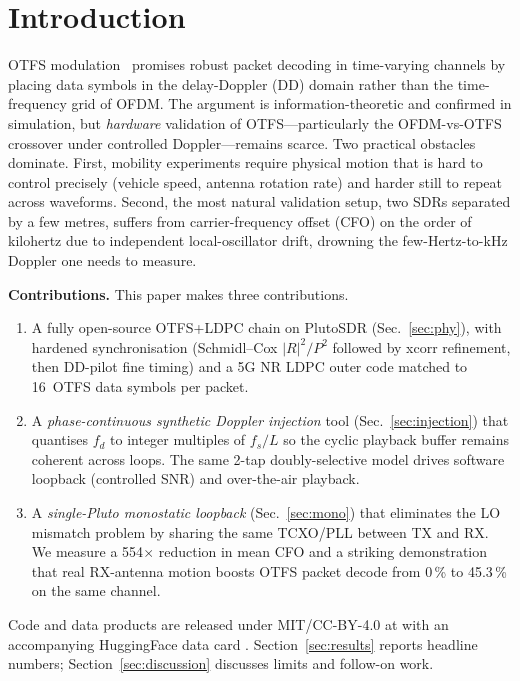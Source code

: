 \documentclass[conference,10pt]{IEEEtran}
\newcommand{\fd}{f_d}
\begin{document}
\section{Introduction}
OTFS modulation~\cite{Hadani2017OTFS} promises robust packet decoding in time-varying channels by placing data symbols in the delay-Doppler (DD) domain rather than the time-frequency grid of OFDM. The argument is information-theoretic and confirmed in simulation, but \emph{hardware} validation of OTFS---particularly the OFDM-vs-OTFS crossover under controlled Doppler---remains scarce. Two practical obstacles dominate. First, mobility experiments require physical motion that is hard to control precisely (vehicle speed, antenna rotation rate) and harder still to repeat across waveforms. Second, the most natural validation setup, two SDRs separated by a few metres, suffers from carrier-frequency offset (CFO) on the order of kilohertz due to independent local-oscillator drift, drowning the few-Hertz-to-kHz Doppler one needs to measure.

\textbf{Contributions.} This paper makes three contributions.
\begin{enumerate}[leftmargin=*,nosep]
  \item A fully open-source OTFS+LDPC chain on PlutoSDR (Sec.~\ref{sec:phy}), with hardened synchronisation (Schmidl--Cox $|R|^2/P^2$ followed by xcorr refinement, then DD-pilot fine timing) and a 5G NR LDPC outer code matched to 16~OTFS data symbols per packet.
  \item A \emph{phase-continuous synthetic Doppler injection} tool (Sec.~\ref{sec:injection}) that quantises $\fd$ to integer multiples of $f_s/L$ so the cyclic playback buffer remains coherent across loops. The same 2-tap doubly-selective model drives software loopback (controlled SNR) and over-the-air playback.
  \item A \emph{single-Pluto monostatic loopback} (Sec.~\ref{sec:mono}) that eliminates the LO mismatch problem by sharing the same TCXO/PLL between TX and RX. We measure a 554$\times$ reduction in mean CFO and a striking demonstration that real RX-antenna motion boosts OTFS packet decode from 0\,\% to 45.3\,\% on the same channel.
\end{enumerate}

Code and data products are released under MIT/CC-BY-4.0 at \cite{repo_rf_stream_phy} with an accompanying HuggingFace data card \cite{hf_dataset}. Section~\ref{sec:results} reports headline numbers; Section~\ref{sec:discussion} discusses limits and follow-on work.
\end{document}
